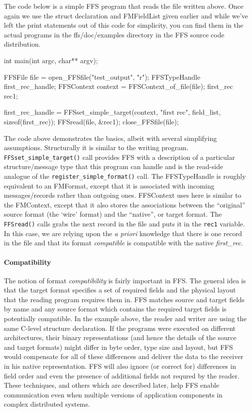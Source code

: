 The code below is a simple FFS program that reads the file written above.
Once again we use the struct declaration and FMFieldList given earlier and
while we've left the print statements out of this code for simplicity, you
can find them in the actual programs in the ffs/doc/examples directory in
the FFS source code distribution. 
\begin{WrapCode}
int
main(int argc, char** argv);
{
    FFSFile file = open_FFSfile("test_output", "r");
    FFSTypeHandle first_rec_handle;
    FFSContext context = FFSContext_of_file(file);
    first_rec rec1;

    first_rec_handle = FFSset_simple_target(context, "first rec", field_list, sizeof(first_rec));
    FFSread(file, &rec1);
    close_FFSfile(file);
}
\end{WrapCode}
The code above demonstrates the basics, albeit with several simplifying
assumptions.  Structurally it is similar to the writing program.  {\tt
  FFSset\_simple\_target()} call provides FFS with a description of a
particular structure/message type that this program can handle and is the
read-side analogue of the {\tt register\_simple\_format()} call. The
FFSTypeHandle is roughly equivalent to an FMFormat, except that it is
associated with incoming messages/records rather than outgoing ones.
FFSContext uses here is similar to the FMContext, except that it also stores
the associations between the ``original'' source format (the `wire' format)
and the ``native'', or target format.  The {\tt FFSread()} calls
grabs the next record in the file and puts it in the {\tt rec1} variable.  In
this case, we are relying upon the {\it a priori} knowledge that there is
one record in the file and that its format {\it compatible} is compatible
with the native {\it first\_rec}.

\paragraph{Compatibility} The notion of format {\it compatibility} is fairly
important in FFS.  The general idea is that the target format specifies a
set of required fields and the physical layout that the reading program
requires them in.  FFS matches source and target fields by name and any
source format which contains the required target fields is potentially
compatible.  In the example above, the reader and writer are using the same
C-level structure declaration.  If the programs were executed on different
architectures, their binary representations (and hence the details of the
source and target formats) might differ in byte order, type size and
layout, but FFS would compensate for all of these differences and deliver the
data to the receiver in his native representation.  FFS will also ignore (or
correct for) differences in field order and even the presence of additional
fields not requred by the reader.  These techniques, and others which are
described later, help FFS enable communication even when multiple versions
of application components in complex distributed systems.

